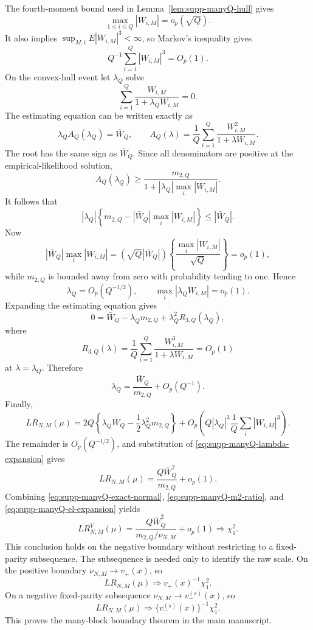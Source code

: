 \documentclass[12pt]{article}
\theoremstyle{remark}
\begin{document}
The fourth-moment bound used in Lemma~\ref{lem:supp-manyQ-hull} gives
\[
\max_{1\le i\le Q}|W_{i,M}|=o_p(\sqrt Q).
\]
It also implies $\sup_{M,i}E|W_{i,M}|^3<\infty$, so Markov's inequality gives
\[
Q^{-1}\sum_{i=1}^Q|W_{i,M}|^3=O_p(1).
\]
On the convex-hull event let $\lambda_Q$ solve
\[
\sum_{i=1}^Q\frac{W_{i,M}}{1+\lambda_QW_{i,M}}=0.
\]
The estimating equation can be written exactly as
\begin{equation*}
\lambda_Q A_Q(\lambda_Q)=\bar W_Q,
\qquad
A_Q(\lambda)
=
\frac1Q\sum_{i=1}^Q\frac{W_{i,M}^2}{1+\lambda W_{i,M}}.
\end{equation*}
The root has the same sign as $\bar W_Q$. Since all denominators are
positive at the empirical-likelihood solution,
\[
A_Q(\lambda_Q)
\ge
\frac{m_{2,Q}}{1+|\lambda_Q|\max_i|W_{i,M}|}.
\]
It follows that
\[
|\lambda_Q|
\left\{
m_{2,Q}-|\bar W_Q|\max_i|W_{i,M}|
\right\}
\le
|\bar W_Q|.
\]
Now
\[
|\bar W_Q|\max_i|W_{i,M}|
=
\left(\sqrt Q|\bar W_Q|\right)
\left\{\frac{\max_i|W_{i,M}|}{\sqrt Q}\right\}
=o_p(1),
\]
while $m_{2,Q}$ is bounded away from zero with probability tending to
one. Hence
\[
\lambda_Q=O_p(Q^{-1/2}),
\qquad
\max_i|\lambda_QW_{i,M}|=o_p(1).
\]
Expanding the estimating equation gives
\[
0
=
\bar W_Q-\lambda_Qm_{2,Q}
+\lambda_Q^2R_{3,Q}(\lambda_Q),
\]
where
\[
R_{3,Q}(\lambda)
=
\frac1Q\sum_{i=1}^Q
\frac{W_{i,M}^3}{1+\lambda W_{i,M}}
=
O_p(1)
\]
at $\lambda=\lambda_Q$. Therefore
\begin{equation}
\lambda_Q
=
\frac{\bar W_Q}{m_{2,Q}}
+
O_p(Q^{-1}).
\label{eq:supp-manyQ-lambda-expansion}
\end{equation}
Finally,
\[
LR_{N,M}(\mu)
=
2Q\left\{
\lambda_Q\bar W_Q-\frac12\lambda_Q^2m_{2,Q}
\right\}
+
O_p\left(
Q|\lambda_Q|^3
\frac1Q\sum_i|W_{i,M}|^3
\right).
\]
The remainder is $O_p(Q^{-1/2})$, and substitution of
\eqref{eq:supp-manyQ-lambda-expansion} gives
\begin{equation}
LR_{N,M}(\mu)
=\frac{Q\bar W_Q^2}{m_{2,Q}}+o_p(1).
\label{eq:supp-manyQ-el-expansion}
\end{equation}
Combining \eqref{eq:supp-manyQ-exact-normal}, \eqref{eq:supp-manyQ-m2-ratio}, and \eqref{eq:supp-manyQ-el-expansion} yields
\begin{equation*}
LR^V_{N,M}(\mu)
=\frac{Q\bar W_Q^2}{m_{2,Q}/\nu_{N,M}}+o_p(1)
\Rightarrow\chi_1^2.
\end{equation*}
This conclusion holds on the negative boundary without restricting to a fixed-parity subsequence. The subsequence is needed only to identify the raw scale. On the positive boundary $\nu_{N,M}\to v_+(x)$, so
\[
LR_{N,M}(\mu)\Rightarrow v_+(x)^{-1}\chi_1^2.
\]
On a negative fixed-parity subsequence $\nu_{N,M}\to v_-^{(s)}(x)$, so
\[
LR_{N,M}(\mu)\Rightarrow\{v_-^{(s)}(x)\}^{-1}\chi_1^2.
\]
This proves the many-block boundary theorem in the main manuscript.
\end{document}
